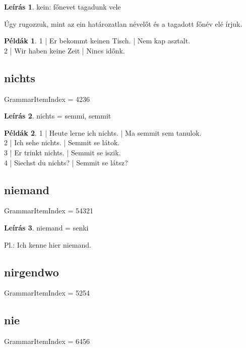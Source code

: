 \documentclass{article}
\theoremstyle{definition}
\newtheorem*{exmp}{Példák}
\newtheorem*{desc}{Leírás}
\begin{document}
\begin{desc}
kein: főnevet tagadunk vele

Úgy rugozzuk, mint az ein határozatlan névelőt és a tagadott főnév elé írjuk.
\end{desc}

\begin{exmp}
1 | Er bekommt keinen Tisch. | Nem kap asztalt.\\
2 | Wir haben keine Zeit | Nincs időnk.\\
\end{exmp}

\subsection{nichts}

GrammarItemIndex = 4236

\begin{desc}
nichts = semmi, semmit
\end{desc}

\begin{exmp}
1 | Heute lerne ich nichts. | Ma semmit sem tanulok.\\
2 | Ich sehe nichts. | Semmit se látok.\\
3 | Er trinkt nichts. | Semmit se iszik.\\
4 | Siechst du nichts? | Semmit se látsz?\\
\end{exmp}

\subsection{niemand}

GrammarItemIndex = 54321

\begin{desc}
niemand = senki

Pl.: Ich kenne hier niemand.
\end{desc}

\subsection{nirgendwo}

GrammarItemIndex = 5254

\subsection{nie}

GrammarItemIndex = 6456
\end{document}
